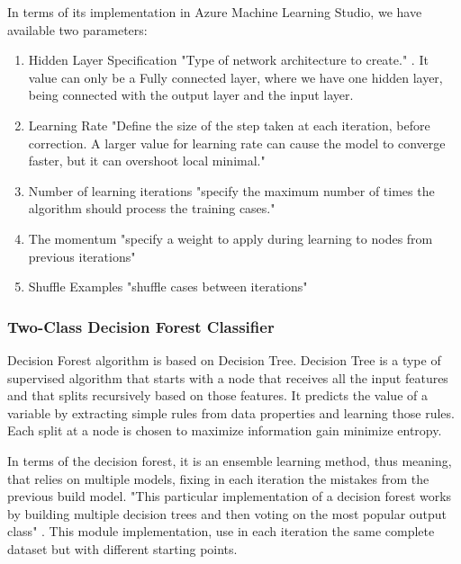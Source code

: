 In terms of its implementation in Azure Machine Learning Studio, we have available two parameters:
\begin{enumerate}
    \item{Hidden Layer Specification}
"Type of network architecture to create." \cite{AZURE_MACHINE_LEARNING}. It value can only be a Fully connected layer, where we have one hidden layer, being connected with the output layer and the input layer.
    \item{Learning Rate}
"Define the size of the step taken at each iteration, before correction. A larger value for learning rate can cause the model to converge faster, but it can overshoot local minimal." \cite{AZURE_MACHINE_LEARNING}
    \item{Number of learning iterations}
"specify the maximum number of times the algorithm should process the training cases." \cite{AZURE_MACHINE_LEARNING}
    \item{The momentum}
"specify a weight to apply during learning to nodes from previous iterations" \cite{AZURE_MACHINE_LEARNING}
    \item{Shuffle Examples}
"shuffle cases between iterations" \cite{AZURE_MACHINE_LEARNING}
\end{enumerate}

\subsubsection{Two-Class Decision Forest Classifier}
Decision Forest algorithm is based on Decision Tree. Decision Tree is a type of supervised algorithm that starts with a node that receives all the input features and that splits recursively based on those features. It predicts the value of a variable by extracting simple rules from data properties and learning those rules. Each split at a node is chosen to maximize information gain minimize entropy.
 
In terms of the decision forest, it is an ensemble learning method, thus meaning, that relies on multiple models, fixing in each iteration the mistakes from the previous build model. "This particular implementation of a decision forest works by building multiple decision trees and then voting on the most popular output class" \cite{AZURE_MACHINE_LEARNING}. This module implementation, use in each iteration the same complete dataset but with different starting points.

